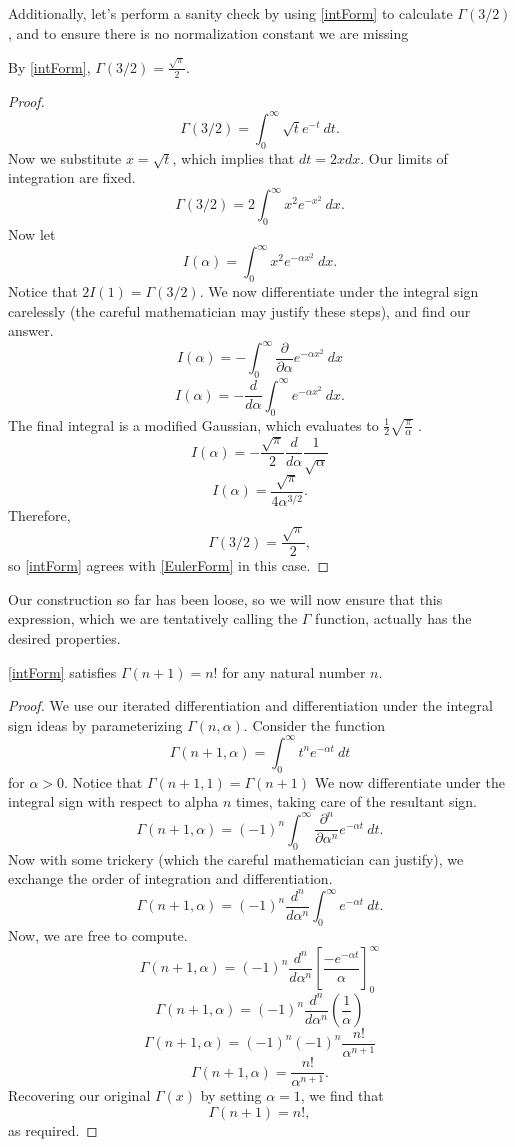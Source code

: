 Additionally, let's perform a sanity check by using \eqref{intForm} to calculate $\Gamma(3/2)$, and to ensure there is no normalization constant we are missing

\begin{prop}
By \eqref{intForm}, $\Gamma(3/2) = \frac{\sqrt{\pi}}{2}$.
\end{prop}

\begin{proof}
$$\Gamma(3/2) = \int_{0}^\infty \sqrt{t} e^{-t} \ dt.$$
Now we substitute $x = \sqrt{t}$, which implies that $dt = 2x dx$.
Our limits of integration are fixed.
$$\Gamma(3/2) = 2\int_{0}^\infty x^2 e^{-x^2} \ dx.$$
Now let
$$I(\alpha) = \int_{0}^\infty x^2 e^{-\alpha x^2} \ dx.$$
Notice that $2I(1) = \Gamma(3/2)$.
We now differentiate under the integral sign carelessly (the careful mathematician may justify these steps), and find our answer.
$$I(\alpha) = -\int_0^\infty \frac{\partial}{\partial \alpha} e^{-\alpha x^2} \ dx$$
$$I(\alpha) = -\frac{d}{d\alpha} \int_{0}^\infty e^{-\alpha x^2} \ dx.$$
The final integral is a modified Gaussian, which evaluates to $\frac{1}{2}\sqrt{\frac{\pi}{\alpha}}$ \cite{Gaussian}.
$$I(\alpha) = -\frac{\sqrt{\pi}}{2}\frac{d}{d\alpha} \frac{1}{\sqrt{\alpha}}$$
$$I(\alpha) = \frac{\sqrt{\pi}}{4\alpha^{3/2}}.$$
Therefore,
$$\Gamma(3/2) = \frac{\sqrt{\pi}}{2},$$
so \eqref{intForm} agrees with \eqref{EulerForm} in this case.
\end{proof}

Our construction so far has been loose, so we will now ensure that this expression, which we are tentatively calling the $\Gamma$ function, actually has the desired properties.

\begin{lem}
\eqref{intForm} satisfies $\Gamma (n+1) = n!$ for any natural number $n$.
\end{lem}

\begin{proof}
We use our iterated differentiation and differentiation under the integral sign ideas by parameterizing $\Gamma(n,\alpha)$.
Consider the function
$$\Gamma(n+1,\alpha) = \int_0^\infty t^{n} e^{-\alpha t} \ dt$$
for $\alpha > 0$.
Notice that $\Gamma(n+1,1) = \Gamma(n+1)$
We now differentiate under the integral sign with respect to alpha $n$ times, taking care of the resultant sign.
$$\Gamma(n+1, \alpha) = (-1)^n \int_{0}^\infty \frac{\partial^n}{\partial \alpha^n} e^{-\alpha t} \ dt.$$
Now with some trickery (which the careful mathematician can justify), we exchange the order of integration and differentiation.
$$\Gamma(n+1, \alpha) = (-1)^n \frac{d^n}{d\alpha^n} \int_{0}^\infty e^{-\alpha t} \ dt.$$
Now, we are free to compute.
$$\Gamma(n+1, \alpha) = (-1)^n \frac{d^n}{d\alpha^n} \left[\frac{-e^{-\alpha t}}{\alpha}\right]_{0}^\infty$$
$$\Gamma(n+1, \alpha) = (-1)^n \frac{d^n}{d\alpha^n} \left( \frac{1}{\alpha} \right)$$
$$\Gamma(n+1, \alpha) = (-1)^n (-1)^n \frac{n!}{\alpha^{n+1}}$$
$$\Gamma(n+1, \alpha) = \frac{n!}{\alpha^{n+1}}.$$
Recovering our original $\Gamma(x)$ by setting $\alpha = 1$, we find that 
$$\Gamma(n+1) = n!,$$
as required.
\end{proof}

